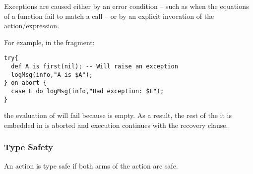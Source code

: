 Exceptions are caused either by an error condition -- such as when the equations of a function fail to match a call -- or by an explicit invocation of the  action/expression.

For example, in the fragment:
\begin{lstlisting}
try{
  def A is first(nil); -- Will raise an exception
  logMsg(info,"A is $A");
} on abort {
  case E do logMsg(info,"Had exception: $E");
}
\end{lstlisting}
the evaluation of  will fail because  is empty. As a result, the rest of the  it is embedded in is aborted and execution continues with the recovery clause.

\subsubsection{Type Safety}
An  action is type safe if both arms of the action are safe.

\begin{prooftree}
\end{prooftree}
